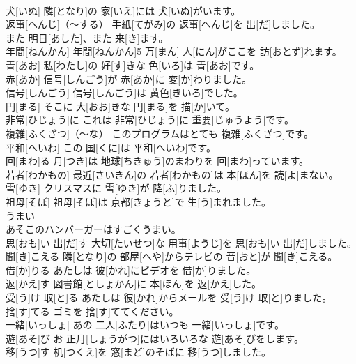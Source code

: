 \documentclass[8pt]{extreport}
\begin{document}
\begin{CJK}{UTF8}{min}
\\	犬[いぬ]	隣[となり]の 家[いえ]には 犬[いぬ]がいます。		
\\	返事[へんじ]（～する）	手紙[てがみ]の 返事[へんじ]を 出[だ]しました。		
\\	また	明日[あした]、また 来[き]ます。		
\\	年間[ねんかん]	年間[ねんかん]5 万[まん] 人[にん]がここを 訪[おとず]れます。		
\\	青[あお]	私[わたし]の 好[す]きな 色[いろ]は 青[あお]です。		
\\	赤[あか]	信号[しんごう]が 赤[あか]に 変[か]わりました。		
\\	信号[しんごう]	信号[しんごう]は 黄色[きいろ]でした。		
\\	円[まる]	そこに 大[おお]きな 円[まる]を 描[か]いて。		
\\	非常[ひじょう]に	これは 非常[ひじょう]に 重要[じゅうよう]です。		
\\	複雑[ふくざつ]（～な）	このプログラムはとても 複雑[ふくざつ]です。		
\\	平和[へいわ]	この 国[くに]は 平和[へいわ]です。		
\\	回[まわ]る	月[つき]は 地球[ちきゅう]のまわりを 回[まわ]っています。		
\\	若者[わかもの]	最近[さいきん]の 若者[わかもの]は 本[ほん]を 読[よ]まない。		
\\	雪[ゆき]	クリスマスに 雪[ゆき]が 降[ふ]りました。		
\\	祖母[そぼ]	祖母[そぼ]は 京都[きょうと]で 生[う]まれました。		
\\	うまい
\\	あそこのハンバーガーはすごくうまい。		
\\	思[おも]い 出[だ]す	大切[たいせつ]な 用事[ようじ]を 思[おも]い 出[だ]しました。		
\\	聞[き]こえる	隣[となり]の 部屋[へや]からテレビの 音[おと]が 聞[き]こえる。		
\\	借[か]りる	あたしは 彼[かれ]にビデオを 借[か]りました。		
\\	返[かえ]す	図書館[としょかん]に 本[ほん]を 返[かえ]した。		
\\	受[う]け 取[と]る	あたしは 彼[かれ]からメールを 受[う]け 取[と]りました。		
\\	捨[す]てる	ゴミを 捨[す]ててください。		
\\	一緒[いっしょ]	あの 二人[ふたり]はいつも 一緒[いっしょ]です。		
\\	遊[あそ]び	お 正月[しょうがつ]にはいろいろな 遊[あそ]びをします。		
\\	移[うつ]す	机[つくえ]を 窓[まど]のそばに 移[うつ]しました。		

\end{CJK}
\end{document}
